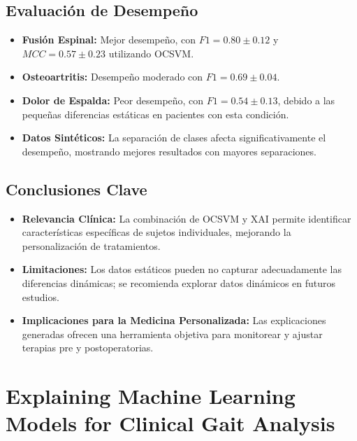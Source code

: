 \documentclass{report}
\begin{document}
\subsection{Evaluación de Desempeño}
\begin{itemize}
    \item \textbf{Fusión Espinal:} Mejor desempeño, con \(F1 = 0.80 \pm 0.12\) y \(MCC = 0.57 \pm 0.23\) utilizando OCSVM.
    \item \textbf{Osteoartritis:} Desempeño moderado con \(F1 = 0.69 \pm 0.04\).
    \item \textbf{Dolor de Espalda:} Peor desempeño, con \(F1 = 0.54 \pm 0.13\), debido a las pequeñas diferencias estáticas en pacientes con esta condición.
    \item \textbf{Datos Sintéticos:} La separación de clases afecta significativamente el desempeño, mostrando mejores resultados con mayores separaciones.
\end{itemize}

\subsection{Conclusiones Clave}
\begin{itemize}
    \item \textbf{Relevancia Clínica:} La combinación de OCSVM y XAI permite identificar características específicas de sujetos individuales, mejorando la personalización de tratamientos.
    \item \textbf{Limitaciones:} Los datos estáticos pueden no capturar adecuadamente las diferencias dinámicas; se recomienda explorar datos dinámicos en futuros estudios.
    \item \textbf{Implicaciones para la Medicina Personalizada:} Las explicaciones generadas ofrecen una herramienta objetiva para monitorear y ajustar terapias pre y postoperatorias.
\end{itemize}




\section{Explaining Machine Learning Models for Clinical Gait Analysis}
\end{document}
